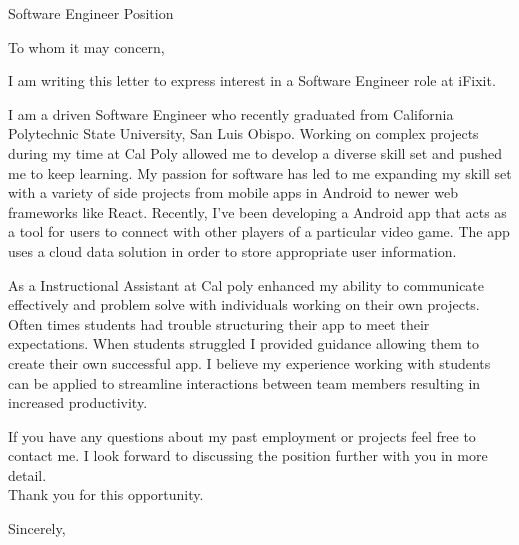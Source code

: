 \documentclass[]{letter}
\makeatletter
\newcommand{\role}{Software Engineer }
\newcommand{\company}{iFixit}
\newcommand{\roleAt}{\role role at \company}
\newcommand{\university}{California Polytechnic State University, San Luis Obispo}
\newcommand{\email}{griffinpjohnson@gmail.com}
\newcommand{\phoneNum}{(425) 417 - 5098 }
\newcommand{\myname}{Griffin Johnson}
\makeatother
\begin{document}

\begin{letter}
{
	\role Position
}

\address
{
	\myname \\
	1200 Oceanaire Dr Apt B \\
	San Luis Obispo, CA 93405 \\
	\email \\
	\phoneNum
}

\opening{To whom it may concern,}

I am writing this letter to express interest in a \roleAt.

I am a driven Software Engineer who recently graduated from \university. Working on complex projects during my time at Cal Poly allowed me to develop a diverse skill set and pushed me to keep learning. My passion for software has led to me expanding my skill set with a variety of side projects from mobile apps in Android to newer web frameworks like React. Recently, I've been developing a Android app that acts as a tool for users to connect with other players of a particular video game. The app uses a cloud data solution in order to store appropriate user information.


As a Instructional Assistant at Cal poly enhanced my ability to communicate effectively and problem solve with individuals working on their own projects. Often times students had trouble structuring their app to meet their expectations. When students struggled I provided guidance allowing them to create their own successful app. I believe my experience working with students can be applied to streamline interactions between team members resulting in increased productivity. 

If you have any questions about my past employment or projects feel free to contact me. I look forward to discussing the position further with you in more detail.  \\

Thank you for this opportunity.

\signature
{ 
	\myname
}


\closing
{
	Sincerely,
}


\end{letter}
\end{document}
